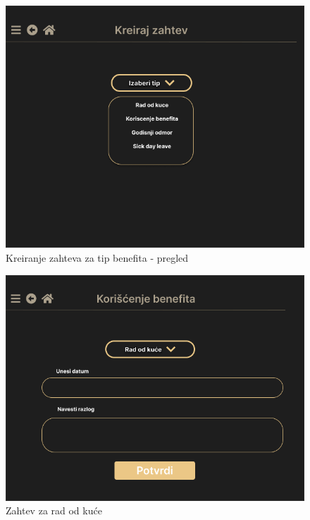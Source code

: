 \documentclass[a4paper]{article}
\begin{document}
\begin{figure} [!ht]
    \begin{center}
        \includegraphics[scale=0.25]{UI/Zaposleni/TipZahtevaOverview.png}
    \end{center}
\caption{Kreiranje zahteva za tip benefita - pregled}
\end{figure}

\begin{figure} [!ht]
    \begin{center}
        \includegraphics[scale=0.25]{UI/Zaposleni/ZahtevRadOdKuceOverview.png}
    \end{center}
\caption{Zahtev za rad od kuće}
\end{figure}
\end{document}
